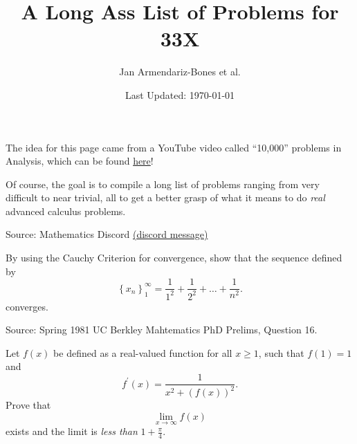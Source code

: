 \documentclass[letterpaper,twoside]{book}
\title{A Long Ass List of Problems for 33X}
\author{Jan Armendariz-Bones et al.}
\date{Last Updated: \today}
\newcounter{ex}
\begin{document}
{\let\newpage\relax\maketitle}
\maketitle
The idea for this page came from a YouTube video called ``10,000'' problems in Analysis, which can be found \href{https://youtu.be/3mvNug_YM-g?si=9sa2EVkcANsY7IBk}{here}!

Of course, the goal is to compile a long list of problems ranging from very difficult to near trivial, all to get a better grasp of what it means to do \emph{real} advanced calculus problems.
\newpage
\begin{que}
		Source: Mathematics Discord \href{https://discord.com/channels/268882317391429632/576508782637744130/1169106442435969094}{(discord message)}

		By using the Cauchy Criterion for convergence, show that the sequence defined by \[\left\{x_n\right\}_1^\infty=\frac{1}{1^2}	+ \frac{1}{2^2}	+ \dots + \frac{1}{n^2}.\] converges.
\end{que}	

\begin{que}
		Source: Spring 1981 UC Berkley Mahtematics PhD Prelims, Question 16.

Let $f(x)$ be defined as a real-valued function for all $x\ge 1$, such that $f(1)=1$ and \[f^\prime(x) = \frac{1}{x^2 + (f(x))^2}.\]
Prove that \[\lim_{x\to\infty}f(x)\] exists and the limit is \emph{less than} $1+\frac{\pi}{4}$. 
\end{que}	
\end{document}
